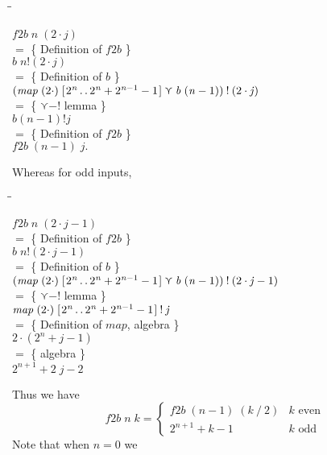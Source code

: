 \documentclass{jfp}
\newcommand{\Varid}[1]{\mathit{#1}}
\newenvironment{sproof}{%
    \begin{tabbing}
    \phantom{$\equiv$} \= \qquad\qquad\qquad\qquad\qquad \= \kill
}{
    \end{tabbing}
}
\newcommand{\stmt}[1]{\> \ensuremath{#1} \\}
\newcommand{\reason}[2]{\ensuremath{#1} \>\> \{ \quad #2 \quad \} \\}
\theoremstyle{definition}
\theoremstyle{remark}
\newcommand{\interleaveop}{\curlyvee}
\begin{document}
\begin{sproof}
  \stmt{\ensuremath{\Varid{f2b}\;\Varid{n}\;(\mathrm{2}\cdot\Varid{j})}}
  \reason{=}{Definition of \ensuremath{\Varid{f2b}}}
  \stmt{\ensuremath{\Varid{b}\;\Varid{n}\mathbin{!}(\mathrm{2}\cdot\Varid{j})}}
  \reason{=}{Definition of \ensuremath{\Varid{b}}}
  \stmt{\ensuremath{(\Varid{map}\;(\mathrm{2}\cdot)\;[\mskip1.5mu \mathrm{2}^ {\Varid{n}}\mathinner{\ldotp\ldotp}\mathrm{2}^ {\Varid{n}}\mathbin{+}\mathrm{2}^ {\Varid{n}\mathbin{-}\mathrm{1}}\mathbin{-}\mathrm{1}\mskip1.5mu]\interleaveop\Varid{b}\;(\Varid{n}\mathbin{-}\mathrm{1}))\mathbin{!}(\mathrm{2}\cdot\Varid{j})}}
  \reason{=}{\ensuremath{\interleaveop\mathbin{-!}} lemma}
  \stmt{b (n-1) ! j}
  \reason{=}{Definition of \ensuremath{\Varid{f2b}}}
  \stmt{\ensuremath{\Varid{f2b}\;(\Varid{n}\mathbin{-}\mathrm{1})\;\Varid{j}}.}
\end{sproof}
Whereas for odd inputs,
\begin{sproof}
  \stmt{\ensuremath{\Varid{f2b}\;\Varid{n}\;(\mathrm{2}\cdot\Varid{j}\mathbin{-}\mathrm{1})}}
  \reason{=}{Definition of \ensuremath{\Varid{f2b}}}
  \stmt{\ensuremath{\Varid{b}\;\Varid{n}\mathbin{!}(\mathrm{2}\cdot\Varid{j}\mathbin{-}\mathrm{1})}}
  \reason{=}{Definition of \ensuremath{\Varid{b}}}
  \stmt{\ensuremath{(\Varid{map}\;(\mathrm{2}\cdot)\;[\mskip1.5mu \mathrm{2}^ {\Varid{n}}\mathinner{\ldotp\ldotp}\mathrm{2}^ {\Varid{n}}\mathbin{+}\mathrm{2}^ {\Varid{n}\mathbin{-}\mathrm{1}}\mathbin{-}\mathrm{1}\mskip1.5mu]\interleaveop\Varid{b}\;(\Varid{n}\mathbin{-}\mathrm{1}))\mathbin{!}(\mathrm{2}\cdot\Varid{j}\mathbin{-}\mathrm{1})}}
  \reason{=}{\ensuremath{\interleaveop\mathbin{-!}} lemma}
  \stmt{\ensuremath{\Varid{map}\;(\mathrm{2}\cdot)\;[\mskip1.5mu \mathrm{2}^ {\Varid{n}}\mathinner{\ldotp\ldotp}\mathrm{2}^ {\Varid{n}}\mathbin{+}\mathrm{2}^ {\Varid{n}\mathbin{-}\mathrm{1}}\mathbin{-}\mathrm{1}\mskip1.5mu]\mathbin{!}\Varid{j}}}
  \reason{=}{Definition of \ensuremath{\Varid{map}}, algebra}
  \stmt{\ensuremath{\mathrm{2}\cdot(\mathrm{2}^ {\Varid{n}}\mathbin{+}\Varid{j}\mathbin{-}\mathrm{1})}}
  \reason{=}{algebra}
  \stmt{\ensuremath{\mathrm{2}^ {\Varid{n}\mathbin{+}\mathrm{1}}\mathbin{+}\mathrm{2}\;\Varid{j}\mathbin{-}\mathrm{2}}}
\end{sproof}
Thus we have
\[ \ensuremath{\Varid{f2b}\;\Varid{n}\;\Varid{k}} = \begin{cases} \ensuremath{\Varid{f2b}\;(\Varid{n}\mathbin{-}\mathrm{1})\;(\Varid{k}\mathbin{/}\mathrm{2})} & k \text{ even} \\ 2^{n+1}
    + k - 1 & k \text{ odd} \end{cases} \] Note that when $n = 0$ we
\end{document}
